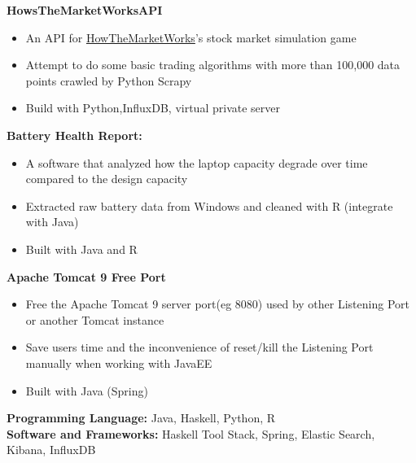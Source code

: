 \documentclass[a4paper,11pt]{article}
\begin{document}
\begin{flushleft}
	
	\textbf{HowsTheMarketWorksAPI}
	\vspace{-\topsep}
	\begin{itemize}
		\setlength{\parskip}{0pt}
		\setlength{\itemsep}{0pt plus 1pt}
		\item An API for \href{https://www.howthemarketworks.com/}{HowTheMarketWorks}'s stock market simulation game 
		\item Attempt to do some basic trading algorithms with more than 100,000 data points crawled by Python Scrapy \item Build with Python,InfluxDB, virtual private server
	\end{itemize}	
	
	\textbf{Battery Health Report:} 
	\vspace{-\topsep}
	\begin{itemize}
		\setlength{\parskip}{0pt}
		\setlength{\itemsep}{0pt plus 1pt}
		\item A software that analyzed how the laptop capacity degrade over time compared to the design capacity 
		\item Extracted raw battery data from Windows and cleaned with R (integrate with Java)
		\item Built with Java and R
	\end{itemize}
	
	\textbf{Apache Tomcat 9 Free Port} 
	\vspace{-\topsep}
	\begin{itemize}
		\setlength{\parskip}{0pt}
		\setlength{\itemsep}{0pt plus 1pt}
		\item Free the Apache Tomcat 9 server port(eg 8080) used by other Listening Port or another Tomcat instance
		\item Save users time and the inconvenience of reset/kill the Listening Port manually when working with JavaEE
		\item Built with Java (Spring)
	\end{itemize}
\centering{\noindent\makebox{\rule{8cm}{1.5pt}}}
\end{flushleft}


\begin{flushleft}
	\textbf{Programming Language:} Java, Haskell, Python, R \\ 
	\doublespacing
	\textbf{Software and Frameworks:} Haskell Tool Stack, Spring, Elastic Search, Kibana, InfluxDB \\
	\vspace{-\topsep}
	\centering{\noindent\makebox{\rule{8cm}{1.5pt}}}
\end{flushleft}
\end{document}
